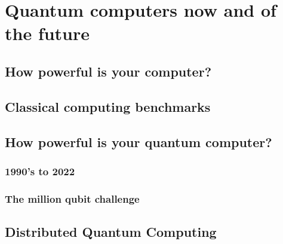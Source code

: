 \chapter{Quantum computers now and of the future}


\section{How powerful is your computer?}

\section{Classical computing benchmarks}

\section{How powerful is your quantum computer?}

\subsection{1990's to 2022}

\subsection{The million qubit challenge}

\section{Distributed Quantum Computing}
